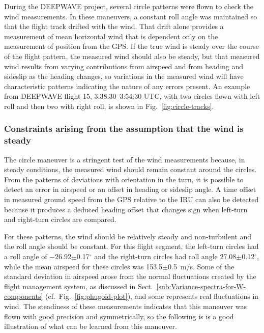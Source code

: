 \documentclass[12pt,twoside,english]{article}\usepackage[]{graphicx}\usepackage[]{color}
\let\OrgIndex\index
\renewcommand*{\index}[1]{\OrgIndex{#1}}
\begin{document}
During the DEEPWAVE project, several circle patterns were flown to check the wind measurements. In these maneuvers, a constant roll angle was maintained so that the flight track drifted with the wind. That drift alone provides a measurement of mean horizontal wind that is dependent only on the measurement of position from the GPS. If the true wind is steady over the course of the flight pattern, the measured wind should also be steady, but that measured wind results from varying contributions from airspeed and from heading and sideslip as the heading changes, so variations in the measured wind will have characteristic patterns indicating the nature of any errors present. An example from DEEPWAVE flight 15, 3:38:30--3:54:30 UTC, with two circles flown with left roll and then two with right roll, is shown in Fig.~\ref{fig:circle-tracks}. 
% 

\subsubsection{Constraints arising from the assumption that the wind is steady}

The circle maneuver is a stringent test of the wind measurements because, in steady conditions, the measured wind should remain constant around the circles. From the patterns of deviations with orientation in the turn, it is possible to detect an error in airspeed or an offset in heading or sideslip angle. A time offset in measured ground speed from the GPS relative to the IRU can also be detected because it produces a deduced heading offset that changes sign when left-turn and right-turn circles are compared. 

For these patterns, the wind should be relatively steady and non-turbulent and the roll angle should be constant. For this flight segment, the left-turn circles had a roll angle of \ensuremath{-26.92}$\pm$0.17$^{\circ}$ and the right-turn circles had roll angle 27.08$\pm$0.12$^{\circ}$, while the mean airspeed for these circles was 153.5$\pm$0.5~m/s. Some of the standard deviation in airspeed arose from the normal fluctuations created by the flight management system, as discussed in Sect.~\ref{sub:Variance-spectra-for-W-components} (cf.~Fig.~\ref{fig:phugoid-plot}), and some represents real fluctuations in wind. The steadiness of these measurements indicates that this maneuver was flown with good precision and symmetrically, so the following is is a good illustration of what can be learned from this maneuver. 
\end{document}
